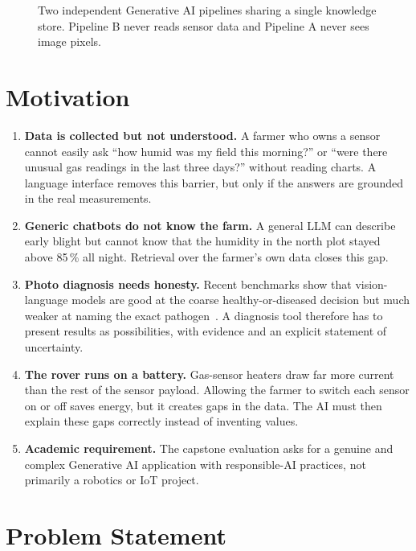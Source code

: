 \begin{figure}[H]
\centering

\caption{Two independent Generative AI pipelines sharing a single knowledge store. Pipeline B never reads sensor data
and Pipeline A never sees image pixels.}
\label{fig:pipelines}
\end{figure}

\section{Motivation}

\begin{enumerate}
\item \textbf{Data is collected but not understood.} A farmer who owns a sensor cannot easily ask
      ``how humid was my field this morning?'' or ``were there unusual gas readings in the last three days?'' without
      reading charts. A language interface removes this barrier, but only if the answers are grounded in the real
      measurements.
\item \textbf{Generic chatbots do not know the farm.} A general LLM can describe early blight but cannot know that the
      humidity in the north plot stayed above 85\,\% all night. Retrieval over the farmer's own data closes this gap.
\item \textbf{Photo diagnosis needs honesty.} Recent benchmarks show that vision-language models are good at the
      coarse healthy-or-diseased decision but much weaker at naming the exact pathogen~\cite{nguyen2026leafnet,ranario2025vlmag}.
      A diagnosis tool therefore has to present results as possibilities, with evidence and an explicit statement of
      uncertainty.
\item \textbf{The rover runs on a battery.} Gas-sensor heaters draw far more current than the rest of the sensor
      payload. Allowing the farmer to switch each sensor on or off saves energy, but it creates gaps in the data. The
      AI must then explain these gaps correctly instead of inventing values.
\item \textbf{Academic requirement.} The capstone evaluation asks for a genuine and complex Generative AI
      application with responsible-AI practices, not primarily a robotics or IoT project.
\end{enumerate}

\section{Problem Statement}

